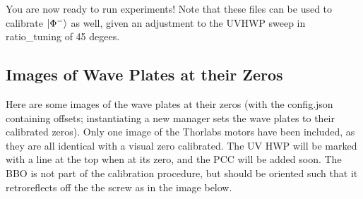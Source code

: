 \documentclass{paper}[11pt]
\begin{document}
You are now ready to run experiments! Note that these files can be used to calibrate $\ket{\Phi^-}$ as well, given an adjustment to the UVHWP sweep in ratio\_tuning of 45 degees. 

\subsection{Images of Wave Plates at their Zeros}
Here are some images of the wave plates at their zeros (with the config.json containing offsets; instantiating a new manager sets the wave plates to their calibrated zeros). Only one image of the Thorlabs motors have been included, as they are all identical with a visual zero calibrated. The UV HWP will be marked with a line at the top when at its zero, and the PCC will be added soon. The BBO is not part of the calibration procedure, but should be oriented such that it retroreflects off the the screw as in the image below.
\end{document}

